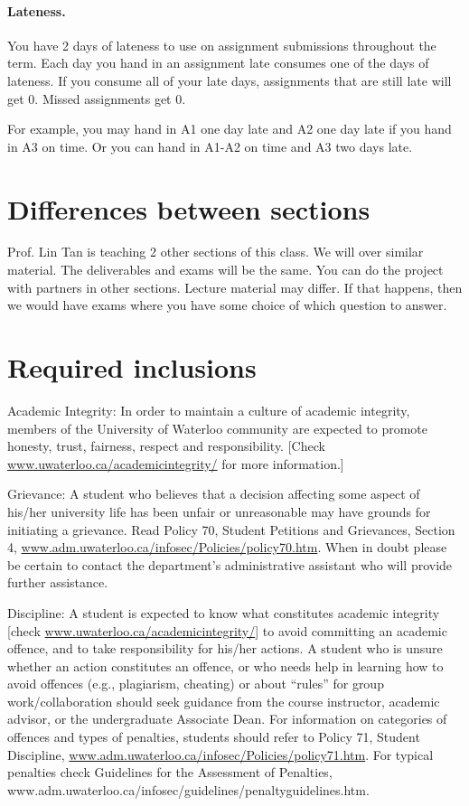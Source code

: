 \documentclass{article}
\begin{document}
\paragraph{Lateness.} You have 2 days of lateness to use on assignment 
submissions throughout the term. Each day you hand in an assignment
late consumes one of the days of lateness. If you consume all of your
late days, assignments that are still late will get 0. Missed assignments get 0.

For example, you may hand in A1 one day late and A2 one day late if
you hand in A3 on time.  Or you can hand in A1-A2 on time and
A3 two days late.

\section*{Differences between sections}
Prof. Lin Tan is teaching 2 other sections of this class. We will
over similar material. The deliverables and exams will be
the same.  You can do the project with partners in other sections.
Lecture material may differ. If that happens, then we would have
exams where you have some choice of which question to answer.

\section*{Required inclusions}
\small \vspace*{-1em}
Academic Integrity: In order to maintain a culture of academic
integrity, members of the University of Waterloo community are
expected to promote honesty, trust, fairness, respect and
responsibility. [Check \url{www.uwaterloo.ca/academicintegrity/} for more
  information.]

\noindent
Grievance: A student who believes that a decision affecting some
aspect of his/her university life has been unfair or unreasonable may
have grounds for initiating a grievance. Read Policy 70, Student
Petitions and Grievances, Section 4,
\url{www.adm.uwaterloo.ca/infosec/Policies/policy70.htm}.  When in doubt
please be certain to contact the department’s administrative assistant
who will provide further assistance.

\noindent
Discipline: A student is expected to know what constitutes academic
integrity [check \url{www.uwaterloo.ca/academicintegrity/}] to avoid
committing an academic offence, and to take responsibility for his/her
actions. A student who is unsure whether an action constitutes an
offence, or who needs help in learning how to avoid offences (e.g.,
plagiarism, cheating) or about “rules” for group work/collaboration
should seek guidance from the course instructor, academic advisor, or
the undergraduate Associate Dean. For information on categories of
offences and types of penalties, students should refer to Policy 71,
Student Discipline,
\url{www.adm.uwaterloo.ca/infosec/Policies/policy71.htm}. For typical
penalties check Guidelines for the Assessment of Penalties,
www.adm.uwaterloo.ca/infosec/guidelines/penaltyguidelines.htm.
\end{document}
